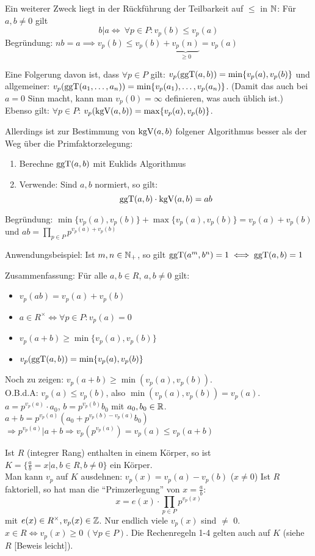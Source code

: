 \documentclass[a4paper,DIV15,BCOR12mm]{article}
\begin{document}
Ein weiterer Zweck liegt in der Rückführung der Teilbarkeit auf
$\le$ in $\mathbb{N}$: Für $a,b\ne 0$ gilt \[b|a \iff \ \forall p\in P:
v_p(b) \le v_p(a) \] Begründung: $nb=a \implies v_p(b) \le v_p(b) + \underbrace{v_p(n)}_{\ge 0} = v_p(a)$

Eine Folgerung davon ist, dass $\forall p\in P$ gilt:
$v_p(\mathop{\rm ggT}\nolimits(a,b)) = \min\{v_p(a), v_p(b)\}$ und allgemeiner:
$v_p(\mathop{\rm ggT}\nolimits(a_1,\ldots,a_n)) = \min\{v_p(a_1),\ldots,v_p(a_n)\}$.
(Damit das auch bei $a = 0$ Sinn macht, kann man $v_p(0) = \infty$
definieren, was auch üblich ist.) Ebenso gilt: $\forall p\in P$:
$v_p(\mathop{\rm kgV}\nolimits(a,b)) = \max\{v_p(a), v_p(b)\}$.

Allerdings ist zur Bestimmung von $\mathop{\rm kgV}\nolimits(a,b)$ folgener Algorithmus
besser als der Weg über die Primfaktorzelegung:
\begin{enumerate}
\item Berechne $\mathop{\rm ggT}\nolimits(a,b)$ mit Euklids Algorithmus
\item Verwende: Sind $a,b$ normiert, so gilt:
\[ \mathop{\rm ggT}\nolimits(a,b) \cdot \mathop{\rm kgV}\nolimits(a,b) = ab \]
\end{enumerate}
Begründung: $\min\{v_p(a), v_p(b)\} + \max\{v_p(a), v_p(b)\} =
v_p(a) + v_p(b)$ und $ab = \prod_{p\in P} p^{v_p(a) + v_p(b)}$

Anwendungsbeispiel: Ist $m,n\in\mathbb{N}_+$, so gilt $\mathop{\rm ggT}\nolimits(a^m,b^n)=1
\iff \mathop{\rm ggT}\nolimits(a,b)=1$

Zusammenfassung: Für alle $a,b\in R$, $a,b\ne 0$ gilt:
\begin{itemize}
\item $v_p(ab) = v_p(a) + v_p(b)$
\item $a\in R^\times \iff \forall p\in P: v_p(a) = 0$
\item $v_p(a+b) \ge \min\{v_p(a),v_p(b)\}$
\item $v_p(\mathop{\rm ggT}\nolimits(a,b)) = \min\{v_p(a),v_p(b)\}$
\end{itemize}

Noch zu zeigen: $v_p(a+b) \ge \min(v_p(a),v_p(b))$.\\
O.B.d.A: $v_p(a) \le v_p(b)$, also $\min(v_p(a),v_p(b)) = v_p(a)$.
$a = p^{v_p(a)} \cdot a_0$, $b = p^{v_p(b)}b_0$ mit $a_0, b_0 \in \mathbb{R}$.\\
$a+b = p^{v_p(a)}(a_0 + p^{v_p(b)-v_p(a)}b_0)$ $\Rightarrow
p^{v_p(a)} | a+b \Rightarrow v_p(p^{v_p(a)}) = v_p(a) \le v_p(a+b)$

\begin{bemerkung}
Ist $R$ (integrer Rang) enthalten in einem Körper, so ist $K = \{\frac{a}{b} = x | a, b \in R, b \not=0\}$ ein Körper.\\
Man kann $v_p$ auf $K$ ausdehnen: $v_p(x) = v_p(a) - v_p(b)$ ($x \ne
0$) Ist $R$ faktoriell, so hat man die "`Primzerlegung"' von $x =
\frac{a}{b}:$
\[ x = e(x) \cdot \prod_{p \in P} p^{v_p(x)} \]
mit $e(x) \in R^\times, v_p(x) \in \mathbb{Z}$. Nur endlich viele $v_p(x)$
sind $\not=$ 0.\\$x \in R \Leftrightarrow v_p(x) \ge 0\ (\forall p
\in P)$. Die Rechenregeln 1-4 gelten auch auf $K$ (siehe $R$ [Beweis
leicht]).
\end{bemerkung}
\end{document}
